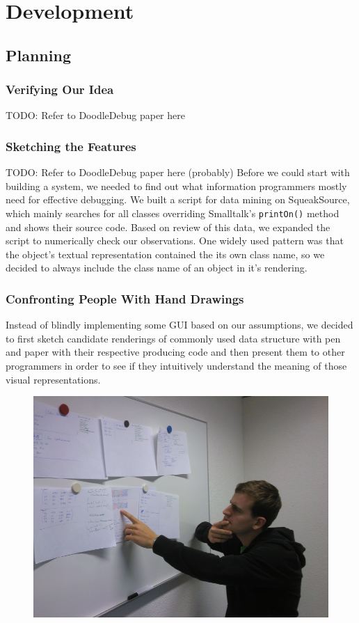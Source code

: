 \documentclass{report}
\begin{document}
\chapter*{Development}
\section*{Planning}

\subsection*{Verifying Our Idea}
TODO: Refer to DoodleDebug paper here

\subsection*{Sketching the Features}
TODO: Refer to DoodleDebug paper here (probably)
Before we could start with building a system, we needed to find out what information programmers mostly need for effective debugging. We built a script for data mining on SqueakSource, which mainly searches for all classes overriding Smalltalk's \verb.printOn(). method and shows their source code. Based on review of this data, we expanded the script to numerically check our observations. One widely used pattern was that the object's textual representation contained the its own class name, so we decided to always include the class name of an object in it's rendering.

\subsection*{Confronting People With Hand Drawings}
Instead of blindly implementing some GUI based on our assumptions, we decided to first sketch candidate renderings of commonly used data structure with pen and paper with their respective producing code and then present them to other programmers in order to see if they intuitively understand the meaning of those visual representations.
\begin{figure}
	\includegraphics[scale=1]{img/design-sketches_thinker.jpg}
\end{figure}
\end{document}
